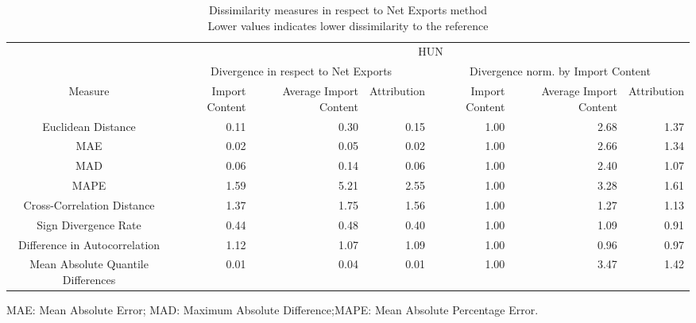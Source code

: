 \begin{table}[t]
\caption*{
{\large Dissimilarity measures in respect to Net Exports method} \\ 
{\small Lower values indicates lower dissimilarity to the reference}
} 
\fontsize{15.0pt}{18.0pt}\selectfont
\begin{tabular*}{\linewidth}{@{\extracolsep{\fill}}crrrrrr}
\toprule
 & \multicolumn{6}{c}{HUN} \\ 
\cmidrule(lr){2-7}
 & \multicolumn{3}{c}{Divergence in respect to Net Exports} & \multicolumn{3}{c}{Divergence norm. by Import Content} \\ 
\cmidrule(lr){2-4} \cmidrule(lr){5-7}
Measure & Import Content & Average Import Content & Attribution & Import Content & Average Import Content & Attribution \\ 
\midrule\addlinespace[2.5pt]
Euclidean Distance & 0.11 & 0.30 & 0.15 & 1.00 & 2.68 & 1.37 \\ 
MAE & 0.02 & 0.05 & 0.02 & 1.00 & 2.66 & 1.34 \\ 
MAD & 0.06 & 0.14 & 0.06 & 1.00 & 2.40 & 1.07 \\ 
MAPE & 1.59 & 5.21 & 2.55 & 1.00 & 3.28 & 1.61 \\ 
Cross-Correlation Distance & 1.37 & 1.75 & 1.56 & 1.00 & 1.27 & 1.13 \\ 
Sign Divergence Rate & 0.44 & 0.48 & 0.40 & 1.00 & 1.09 & 0.91 \\ 
Difference in Autocorrelation & 1.12 & 1.07 & 1.09 & 1.00 & 0.96 & 0.97 \\ 
Mean Absolute Quantile Differences & 0.01 & 0.04 & 0.01 & 1.00 & 3.47 & 1.42 \\ 
\bottomrule
\end{tabular*}
\begin{minipage}{\linewidth}
MAE: Mean Absolute Error; MAD: Maximum Absolute Difference;MAPE: Mean Absolute Percentage Error.\\
\end{minipage}
\end{table}

